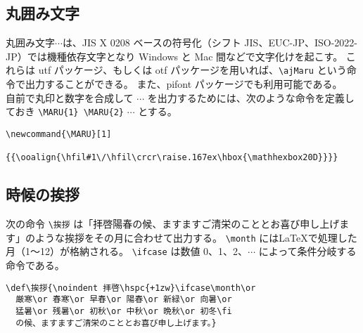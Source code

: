 \subsection{丸囲み文字}
丸囲み文字$\cdots$は、JIS X 0208 ベースの符号化（シフト JIS、EUC-JP、ISO-2022-JP）では機種依存文字となり Windows と Mac 間などで文字化けを起こす。
これらは utf パッケージ、もしくは otf パッケージを用いれば、\verb`\ajMaru` という命令で出力することができる。
また、pifont パッケージでも利用可能である。\\

自前で丸印と数字を合成して   $\cdots$ を出力するためには、次のような命令を定義しておき \verb`\MARU{1} \MARU{2}` $\cdots$ とする。
\begin{mdframed}[roundcorner=0.50zw,leftmargin=3.00zw,rightmargin=3.00zw,skipabove=0.40zw,skipbelow=0.40zw,innertopmargin=4.00pt,innerbottommargin=4.00pt,innerleftmargin=5.00pt,innerrightmargin=5.00pt,linecolor=gray!020,linewidth=0.50pt,backgroundcolor=gray!20]
\begin{verbatim}
\newcommand{\MARU}[1]
           {{\ooalign{\hfil#1\/\hfil\crcr\raise.167ex\hbox{\mathhexbox20D}}}}
\end{verbatim}
\end{mdframed}
\subsection{時候の挨拶}
次の命令 \verb`\挨拶` は「拝啓陽春の候、ますますご清栄のこととお喜び申し上げます」のような挨拶をその月に合わせて出力する。
\verb`\month` には\LaTeX{}で処理した月（1～12）が格納される。
\verb`\ifcase` は数値 0、1、2、$\cdots$ によって条件分岐する命令である。
\begin{mdframed}[roundcorner=0.50zw,leftmargin=3.00zw,rightmargin=3.00zw,skipabove=0.40zw,skipbelow=0.40zw,innertopmargin=4.00pt,innerbottommargin=4.00pt,innerleftmargin=5.00pt,innerrightmargin=5.00pt,linecolor=gray!020,linewidth=0.50pt,backgroundcolor=gray!20]
\begin{verbatim}
\def\挨拶{\noindent 拝啓\hspc{+1zw}\ifcase\month\or
  厳寒\or 春寒\or 早春\or 陽春\or 新緑\or 向暑\or
  猛暑\or 残暑\or 初秋\or 中秋\or 晩秋\or 初冬\fi
  の候、ますますご清栄のこととお喜び申し上げます。}
\end{verbatim}
\end{mdframed}
